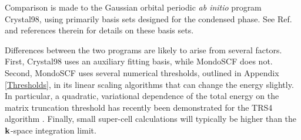 \documentclass[prb,aps,nobibnotes,twocolumn,doublespace,twocolumngrid,superbib]{revtex4}
\begin{document}
Comparison is made to the Gaussian orbital periodic {\em ab initio} program {\sc Crystal98}, using
primarily basis sets designed for the condensed phase.  See Ref.~ and references 
therein for details on these basis sets. 


Differences between the two programs are likely to arise from several factors.  First, {\sc Crystal98}
 uses an auxiliary fitting basis, while {\sc MondoSCF} does not.  Second, {\sc MondoSCF} uses several 
numerical thresholds, outlined in Appendix \ref{Thresholds}, in its linear scaling algorithms that can change 
the energy slightly.   In particular, a quadratic, variational dependence of the total energy
on the  matrix truncation threshold has recently been demonstrated for the {\sc TRS4} algorithm 
\cite{ANiklasson03}.  Finally, small super-cell calculations will typically be higher than the 
${\bf k}$-space integration limit.  

\end{document}

